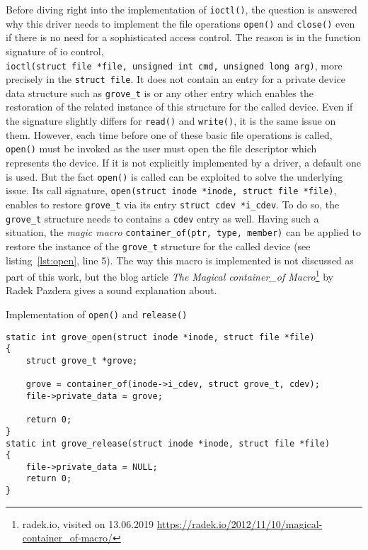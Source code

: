 Before diving right into the implementation of \texttt{ioctl()}, the question is answered why this driver needs to implement the file operations \texttt{open()} and \texttt{close()} even if there is no need for a sophisticated access control.
%
%
The reason is in the function signature of \ac{io} control,\\\texttt{ioctl(struct file *file, unsigned int cmd, unsigned long arg)}, more\\precisely in the \texttt{struct file}.
It does not contain an entry for a private device data structure such as \texttt{grove_t} is or any other entry which enables the restoration of the related instance of this structure for the called device.
Even if the signature slightly differs for \texttt{read()} and \texttt{write()}, it is the same issue on them.
However, each time before one of these basic file operations is called, \texttt{open()} must be invoked as the user must open the file descriptor which represents the device.
If it is not explicitly implemented by a driver, a default one is used.
But the fact \texttt{open()} is called can be exploited to solve the underlying issue.
Its call signature, \texttt{open(struct inode *inode, struct file *file)}, enables to restore \texttt{grove\_t} via its entry \texttt{struct cdev *i\_cdev}.
To do so, the \texttt{grove\_t} structure needs to contains a \texttt{cdev} entry as well.
Having such a situation, the \textit{magic macro} \texttt{container\_of(ptr, type, member)} can be applied to restore the instance of the \texttt{grove\_t} structure for the called device (see listing~\ref{lst:open}, line 5).
The way this macro is implemented is not discussed as part of this work, but the blog article \textit{The Magical container\_of Macro}\footnote{radek.io, visited on 13.06.2019 \url{https://radek.io/2012/11/10/magical-container_of-macro/}} by Radek Pazdera gives a sound explanation about.
%
\begin{listing} [H]
    \caption{Implementation of \texttt{open()} and \texttt{release()}}
    \label{lst:open}
    \begin{verbatim}
static int grove_open(struct inode *inode, struct file *file)
{
    struct grove_t *grove;

    grove = container_of(inode->i_cdev, struct grove_t, cdev);
    file->private_data = grove;

    return 0;
}
static int grove_release(struct inode *inode, struct file *file)
{
    file->private_data = NULL;
    return 0;
}
    \end{verbatim}
\end{listing}
